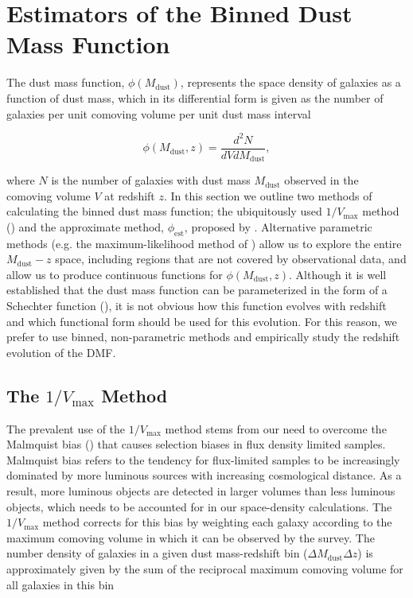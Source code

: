 \section{Estimators of the Binned Dust Mass Function}
\label{sec:dmf_estimators}

The dust mass function, $\phi(M_{\textrm{dust}})$, represents the space density of galaxies as a function of dust mass, which in its differential form is given as the number of galaxies per unit comoving volume per unit dust mass interval

\begin{equation}
    \phi(M_{\textrm{dust}}, z) = \frac{d^2N}{dV dM_{\textrm{dust}}},
\label{eq:differential_phi}
\end{equation}

\noindent where $N$ is the number of galaxies with dust mass $M_{\textrm{dust}}$ observed in the comoving volume $V$ at redshift $z$. In this section we outline two methods of calculating the binned dust mass function; the ubiquitously used $1/V_{\textrm{max}}$ method \mbox{(\citealt{Schmidt_1968, Felten_1976, Avni_1980})} and the approximate method, $\phi_{\textrm{est}}$, proposed by \citealt{Page_2000}. Alternative parametric methods (e.g. the maximum-likelihood method of \citealt{Marshall_1983}) allow us to explore the entire $M_{\textrm{dust}} - z$ space, including regions that are not covered by observational data, and allow us to produce continuous functions for $\phi(M_{\textrm{dust}}, z)$. Although it is well established that the dust mass function can be parameterized in the form of a Schechter function (\citealt{Press_1974, Schechter_1976}), it is not obvious how this function evolves with redshift and which functional form should be used for this evolution. For this reason, we prefer to use binned, non-parametric methods and empirically study the redshift evolution of the DMF.

\subsection{The $1/V_{\textrm{max}}$ Method}

The prevalent use of the $1/V_{\textrm{max}}$ method stems from our need to overcome the Malmquist bias (\citealt{Eddington_1914, Malmquist_1922}) that causes selection biases in flux density limited samples. Malmquist bias refers to the tendency for flux-limited samples to be increasingly dominated by more luminous sources with increasing cosmological distance. As a result, more luminous objects are detected in larger volumes than less luminous objects, which needs to be accounted for in our space-density calculations. The $1/V_{\textrm{max}}$ method corrects for this bias by weighting each galaxy according to the maximum comoving volume in which it can be observed by the survey. The number density of galaxies in a given dust mass-redshift bin ($\Delta M_{\textrm{dust}} \Delta z$) is approximately given by the sum of the reciprocal maximum comoving volume for all galaxies in this bin

